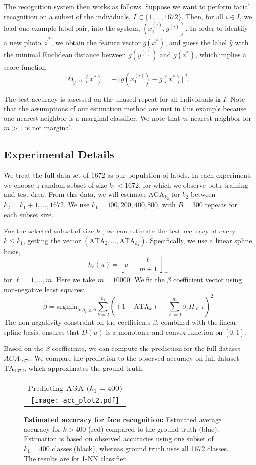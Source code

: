 \documentclass[twoside,11pt]{article}
\newcommand{\argmin}{\text{argmin}}
\newenvironment{myfont}{\fontfamily{phv}\selectfont}{\par}
\begin{document}
The recognition system then works as follows.  Suppose we want to
perform facial recognition on a subset of the individuals, $I \subset
\{1,\hdots, 1672\}$.  Then, for all $i \in I$, we load one example-label pair, into the system, $(x_1^{(i)}, y^{(i)})$.  In
order to identify a new photo $\vec{z}^*$, we obtain the feature
vector $g(x^*)$, and guess the label $\hat{y}$
with the minimal Euclidean distance between $g(y^{(i)})$ and $g(x^*)$,
which implies a score function
\[
M_{y^{(i)}}(x^*) = -||g(x_1^{(i)}) - g(x^*)||^2.
\]


The test accuracy is assessed on the unused repeat for all individuals
in $I$.  Note that the assumptions of our estimation method are met in
this example because one-nearest neighbor is a marginal classifier.
We note that $m$-nearest neighbor for $m > 1$ is not marginal.

\subsection{Experimental Details}\label{sec:exp_details}
We treat the full data-set of $1672$ as our population of labels. In
each experiment, we choose a random subset of size $k_1<1672$, for
which we observe both training and test data. From this data, we will
estimate $\text{AGA}_{k_2}$ for $k_2$ between $k_2 =
k_1+1,...,1672$. We use $k_1 = 100,200,400,800$, with $B = 300$
repeats for each subset size.

For the selected subset of size $k_1$, we can estimate the test
accuracy at every $k \leq k_1$, getting the vector
$(\text{ATA}_2,...,\text{ATA}_{k_1})$.  Specifically, we use a linear
spline basis,
\[
h_\ell(u) = \left[u - \frac{\ell}{m + 1}\right]_+
\]
for $\ell = 1,\hdots, m$.  Here we take $m = 10000$. 
We fit the $\beta$ coefficient vector using non-negative least squares: 
\[
\hat{\beta} = \argmin_{\beta: \beta_\ell \geq 0} \sum_{k=2}^{k_1} \left( (1 - \text{ATA}_k) - \sum_{\ell=1}^m \beta_\ell H_{\ell, k}\right)^2
\]
The non-negativity constraint on the coefficients $\beta$, combined
with the linear spline basis, ensures that ${D}(u)$ is a monotonic
and convex function on $[0,1]$.

Based on the $\beta$ coefficients, we can compute the prediction for
the full dataset $\hat{AGA}_{1672}$.  We compare the prediction to the
observed accuracy on full dataset $\text{TA}_{1672}$, which
approximates the ground truth.


\begin{figure}
\centering
\begin{tabular}{c}
\begin{myfont}Predicting $\text{AGA}$ ($k_1= 400$) \end{myfont}\\
\texttt{[image: acc\_plot2.pdf]}
\end{tabular}
\caption{\textbf{Estimated accuracy for face recognition:}
Estimated average accuracy for $k > 400$ (red) compared to the ground truth (blue). Estimation is based on observed accuracies using one subset of $k_1=400$ classes (black), whereas ground truth uses all 1672 classes. The results are for 1-NN classifier.}
\label{fig:lfw_extrapolation1}
\end{figure}
\end{document}
